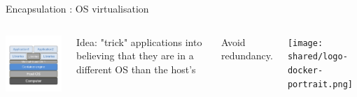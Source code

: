 \begin{frame}{Encapsulation : OS virtualisation}
\begin{columns}

\includegraphics[width=6cm]{02_encapsulation/figures/intro_encapsulation_v2-10.pdf}

Idea: "trick" applications into believing that they are in a different OS than the host's

Avoid redundancy.

\texttt{[image: shared/logo-docker-portrait.png]}

\end{columns}
\end{frame}

